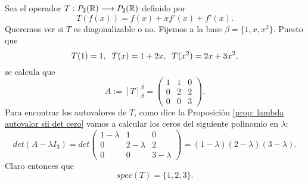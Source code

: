 \begin{ejem}
Sea el operador $T: P_{2}(\mathbb{R}) \longrightarrow P_{2}(\mathbb{R})$
definido por 
\begin{equation}
	\label{ejem: def T operador en polinomios}
	T(f(x)) = f(x) + x f'(x) + f'(x).
\end{equation}
Queremos ver si $T$ es diagonalizable o no.
Fijemos a la base $\beta = \{ 1, x, x^{2} \}$.
Puesto que 
\[
T(1) = 1, \hspace{0.2cm}
T(x) = 1 + 2x, \hspace{0.2cm}
T(x^{2}) = 2x + 3x^{2},
\]
se calcula que
\begin{equation}
A :=
[T]_{\beta}^{\beta} = \begin{pmatrix}
1 & 1 & 0 \\
0 & 2 & 2 \\
0 & 0 & 3
\end{pmatrix}.
\end{equation}
Para encontrar los autovalores de $T$, 
como dice la Proposición 
\ref{prop: lambda autovalor sii det cero}
vamos
a calcular los ceros del siguiente polinomio en $\lambda$:
\[
det(A - \lambda I_{3}) = det
\begin{pmatrix}
1-\lambda & 1 & 0 \\
0 & 2-\lambda & 2 \\
0 & 0 & 3 -\lambda
\end{pmatrix}
= (1- \lambda)(2-\lambda)(3 - \lambda).
\]
Claro entonces que
\[
spec(T) = \{ 1, 2, 3 \}.
\]


\end{ejem}
